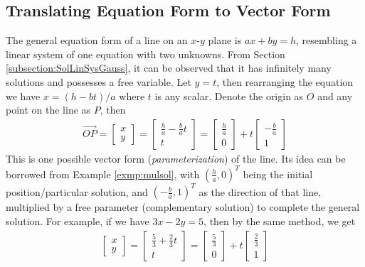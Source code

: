 \subsection{Translating Equation Form to Vector Form}
The general equation form of a line on an $x$-$y$ plane is $ax + by = h$, resembling a linear system of one equation with two unknowns. From Section \ref{subsection:SolLinSysGauss}, it can be observed that it has infinitely many solutions and possesses a free variable. Let $y = t$, then rearranging the equation we have $x = (h - bt)/a$ where $t$ is any scalar. Denote the origin as $O$ and any point on the line as $P$, then 
\begin{align*}
\overrightarrow{OP} =
\begin{bmatrix}
x \\
y
\end{bmatrix}
=
\begin{bmatrix}
\frac{h}{a} - \frac{b}{a}t\\
t
\end{bmatrix}
= 
\begin{bmatrix}
\frac{h}{a}\\
0
\end{bmatrix}
+ t
\begin{bmatrix}
-\frac{b}{a}\\
1
\end{bmatrix}
\end{align*}
This is one possible vector form (\textit{parameterization}) of the line. Its idea can be borrowed from Example \ref{exmp:mulsol}, with $(\frac{h}{a}, 0)^T$ being the initial position/particular solution, and $(-\frac{b}{a}, 1)^T$ as the direction of that line, multiplied by a free parameter (complementary solution) to complete the general solution. For example, if we have $3x - 2y = 5$, then by the same method, we get
\begin{align*}
\begin{bmatrix}
x \\
y
\end{bmatrix}
=
\begin{bmatrix}
\frac{5}{3} + \frac{2}{3}t\\
t
\end{bmatrix}
= 
\begin{bmatrix}
\frac{5}{3}\\
0
\end{bmatrix}
+ t
\begin{bmatrix}
\frac{2}{3}\\
1
\end{bmatrix}    
\end{align*}
